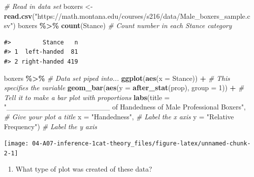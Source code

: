 \documentclass[
]{report}
\newenvironment{Shaded}{\begin{snugshade}}{\end{snugshade}}
\newcommand{\AttributeTok}[1]{\textcolor[rgb]{0.13,0.29,0.53}{#1}}
\newcommand{\CommentTok}[1]{\textcolor[rgb]{0.56,0.35,0.01}{\textit{#1}}}
\newcommand{\DecValTok}[1]{\textcolor[rgb]{0.00,0.00,0.81}{#1}}
\newcommand{\FunctionTok}[1]{\textcolor[rgb]{0.13,0.29,0.53}{\textbf{#1}}}
\newcommand{\NormalTok}[1]{#1}
\newcommand{\OtherTok}[1]{\textcolor[rgb]{0.56,0.35,0.01}{#1}}
\newcommand{\SpecialCharTok}[1]{\textcolor[rgb]{0.81,0.36,0.00}{\textbf{#1}}}
\newcommand{\StringTok}[1]{\textcolor[rgb]{0.31,0.60,0.02}{#1}}
\providecommand{\tightlist}{%
  \setlength{\itemsep}{0pt}\setlength{\parskip}{0pt}}
\begin{document}
\begin{Shaded}
\begin{Highlighting}[]
 \CommentTok{\# Read in data set}
\NormalTok{boxers }\OtherTok{\textless{}{-}} \FunctionTok{read.csv}\NormalTok{(}\StringTok{"https://math.montana.edu/courses/s216/data/Male\_boxers\_sample.csv"}\NormalTok{)}
\NormalTok{boxers }\SpecialCharTok{\%\textgreater{}\%} \FunctionTok{count}\NormalTok{(Stance)  }\CommentTok{\# Count number in each Stance category}
\end{Highlighting}
\end{Shaded}

\begin{verbatim}
#>         Stance   n
#> 1  left-handed  81
#> 2 right-handed 419
\end{verbatim}

\newpage

\begin{Shaded}
\begin{Highlighting}[]
\NormalTok{boxers }\SpecialCharTok{\%\textgreater{}\%} \CommentTok{\# Data set piped into...}
    \FunctionTok{ggplot}\NormalTok{(}\FunctionTok{aes}\NormalTok{(}\AttributeTok{x =}\NormalTok{ Stance)) }\SpecialCharTok{+}   \CommentTok{\# This specifies the variable}
    \FunctionTok{geom\_bar}\NormalTok{(}\FunctionTok{aes}\NormalTok{(}\AttributeTok{y =} \FunctionTok{after\_stat}\NormalTok{(prop), }\AttributeTok{group =} \DecValTok{1}\NormalTok{)) }\SpecialCharTok{+}  \CommentTok{\# Tell it to make a bar plot with proportions}
    \FunctionTok{labs}\NormalTok{(}\AttributeTok{title =} \StringTok{"\_\_\_\_\_\_\_\_\_\_\_\_\_\_\_\_\_\_\_\_ of Handedness of Male Professional Boxers"}\NormalTok{,  }
       \CommentTok{\# Give your plot a title}
       \AttributeTok{x =} \StringTok{"Handedness"}\NormalTok{,   }\CommentTok{\# Label the x axis}
       \AttributeTok{y =} \StringTok{"Relative Frequency"}\NormalTok{)  }\CommentTok{\# Label the y axis}
\end{Highlighting}
\end{Shaded}

\begin{center}\texttt{[image: 04-A07-inference-1cat-theory\_files/figure-latex/unnamed-chunk-2-1]} \end{center}

\begin{enumerate}
\def\labelenumi{\arabic{enumi}.}
\tightlist
\item
  What type of plot was created of these data?
\end{enumerate}
\end{document}
